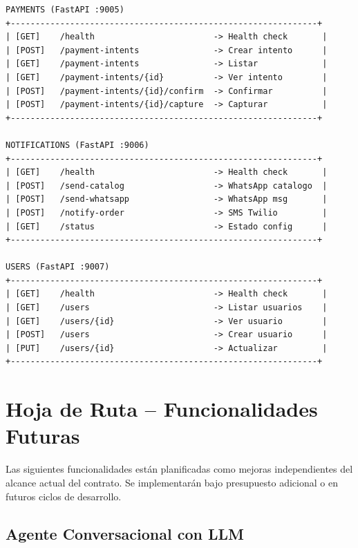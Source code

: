 \documentclass[11pt,a4paper]{article}
\begin{document}
\begin{verbatim}
PAYMENTS (FastAPI :9005)
+--------------------------------------------------------------+
| [GET]    /health                        -> Health check       |
| [POST]   /payment-intents               -> Crear intento      |
| [GET]    /payment-intents               -> Listar             |
| [GET]    /payment-intents/{id}          -> Ver intento        |
| [POST]   /payment-intents/{id}/confirm  -> Confirmar          |
| [POST]   /payment-intents/{id}/capture  -> Capturar           |
+--------------------------------------------------------------+

NOTIFICATIONS (FastAPI :9006)
+--------------------------------------------------------------+
| [GET]    /health                        -> Health check       |
| [POST]   /send-catalog                  -> WhatsApp catalogo  |
| [POST]   /send-whatsapp                 -> WhatsApp msg       |
| [POST]   /notify-order                  -> SMS Twilio         |
| [GET]    /status                        -> Estado config      |
+--------------------------------------------------------------+

USERS (FastAPI :9007)
+--------------------------------------------------------------+
| [GET]    /health                        -> Health check       |
| [GET]    /users                         -> Listar usuarios    |
| [GET]    /users/{id}                    -> Ver usuario        |
| [POST]   /users                         -> Crear usuario      |
| [PUT]    /users/{id}                    -> Actualizar         |
+--------------------------------------------------------------+
\end{verbatim}

\section{Hoja de Ruta -- Funcionalidades Futuras}

Las siguientes funcionalidades están planificadas como mejoras independientes del alcance actual del contrato. Se implementarán bajo presupuesto adicional o en futuros ciclos de desarrollo.

\subsection{Agente Conversacional con LLM}
\end{document}
